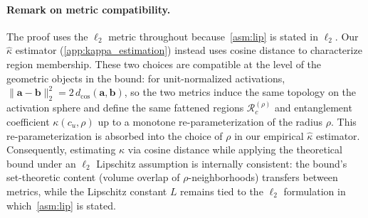 \paragraph{Remark on metric compatibility.}
The proof uses the $\ell_2$ metric throughout because~\cref{asm:lip} is stated in $\ell_2$. Our $\hat\kappa$ estimator (\cref{app:kappa_estimation}) instead uses cosine distance to characterize region membership. These two choices are compatible at the level of the geometric objects in the bound: for unit-normalized activations, $\|\mathbf{a} - \mathbf{b}\|_2^2 = 2\,d_{\cos}(\mathbf{a}, \mathbf{b})$, so the two metrics induce the same topology on the activation sphere and define the same fattened regions $\mathcal{R}_c^{(\rho)}$ and entanglement coefficient $\kappa(c_u,\rho)$ up to a monotone re-parameterization of the radius $\rho$. This re-parameterization is absorbed into the choice of $\rho$ in our empirical $\hat\kappa$ estimator. Consequently, estimating $\kappa$ via cosine distance while applying the theoretical bound under an $\ell_2$ Lipschitz assumption is internally consistent: the bound's set-theoretic content (volume overlap of $\rho$-neighborhoods) transfers between metrics, while the Lipschitz constant $L$ remains tied to the $\ell_2$ formulation in which~\cref{asm:lip} is stated.



